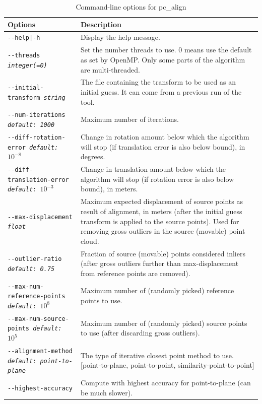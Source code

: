 \begin{longtable}{|p{8cm}|p{9cm}|}
\caption{Command-line options for pc\_align}
\label{tbl:pcalign}
\endfirsthead
\endhead
\endfoot
\endlastfoot
\hline
Options & Description \\ \hline \hline
\texttt{-\/-help|-h} & Display the help message.\\ \hline
\texttt{-\/-threads \textit{integer(=0)}} & Set the number threads to
use. 0 means use the default as set by OpenMP. Only some parts of the algorithm are multi-threaded.\\ \hline
\texttt{-\/-initial-transform \textit{string}} &
The file containing the transform to be used as an
initial guess. It can come from a previous run of the tool. \\ \hline
\texttt{-\/-num-iterations \textit{default: 1000}} &  Maximum number of iterations. \\ \hline
\texttt{-\/-diff-rotation-error \textit{default: $10^{-8}$}} & Change in rotation amount below which the algorithm will stop (if translation error is also below bound), in degrees. \\ \hline
\texttt{-\/-diff-translation-error \textit{default: $10^{-3}$}} & Change in translation amount below which the algorithm will stop (if rotation error is also below bound), in meters. \\ \hline
\texttt{-\/-max-displacement \textit{float}} & Maximum expected
displacement of source points as result of alignment, in meters (after
the initial guess transform is applied to the source points). Used
for removing gross outliers in the source (movable) point cloud.\\ \hline
\texttt{-\/-outlier-ratio \textit{default: 0.75}} &  Fraction of source (movable) points considered inliers (after gross outliers further than max-displacement from reference points are removed). \\ \hline
\texttt{-\/-max-num-reference-points \textit{default: $10^8$}} &
Maximum number of (randomly picked) reference points to use. \\ \hline
\texttt{-\/-max-num-source-points \textit{default: $10^5$}} & Maximum number of (randomly picked) source points to use (after discarding gross outliers). \\ \hline
\texttt{-\/-alignment-method \textit{default: point-to-plane}} & The type of iterative closest point method to use. [point-to-plane, point-to-point, similarity-point-to-point]\\ \hline
\texttt{-\/-highest-accuracy} & Compute with highest accuracy for point-to-plane (can be much slower). \\ \hline


\end{longtable}
